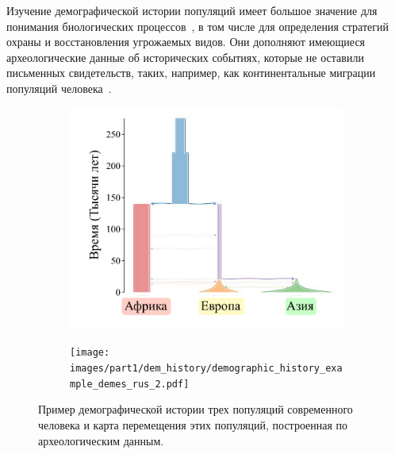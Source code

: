 Изучение демографической истории популяций имеет большое значение для понимания биологических процессов~\cite{nielsen2007recent}, в том числе для определения стратегий охраны и восстановления угрожаемых видов.
Они дополняют имеющиеся археологические данные об исторических событиях, которые не оставили письменных свидетельств, таких, например, как континентальные миграции популяций человека~\cite{mellars2006going, goebel2008late}.

\begin{figure}[ht]
    \centering
    \begin{subfigure}[b]{.48\textwidth}
    \includegraphics[width=\textwidth]{images/part1/dem_history/demographic_history_example_demes_rus_1.pdf}
    \caption{}
    \label{fig:part1:dem_inf:dem_his_arch_1}
    \end{subfigure}%
    \begin{subfigure}[b]{.48\textwidth}
    \texttt{[image: images/part1/dem\_history/demographic\_history\_example\_demes\_rus\_2.pdf]}
    \caption{}
    \label{fig:part1:dem_inf:dem_his_arch_2}
    \end{subfigure}
    \caption{Пример демографической истории трех популяций современного человека и карта перемещения этих популяций, построенная по археологическим данным.}
    \label{fig:part1:dem_inf:dem_his_arch}
\end{figure}

